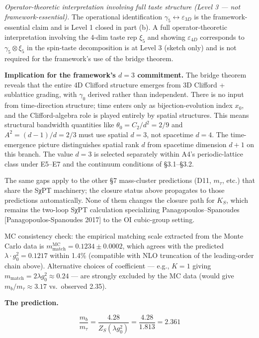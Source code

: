 \documentclass[
]{article}
\begin{document}
\emph{Operator-theoretic interpretation involving full taste structure
(Level 3 --- not framework-essential).} The operational identification
\(\gamma_5 \leftrightarrow \varepsilon_{3D}\) is the framework-essential
claim and is Level 1 closed in part (b). A full operator-theoretic
interpretation involving the 4-dim taste rep \(\xi_5\) and showing
\(\varepsilon_{4D}\) corresponds to \(\gamma_5 \otimes \xi_5\) in the
spin-taste decomposition is at Level 3 (sketch only) and is not required
for the framework's use of the bridge theorem.

\textbf{Implication for the framework's \(d = 3\) commitment.} The
bridge theorem reveals that the entire 4D Clifford structure emerges
from 3D Clifford + sublattice grading, with \(\gamma_0\) derived rather
than independent. There is no input from time-direction structure; time
enters only as bijection-evolution index \(x_0\), and the
Clifford-algebra role is played entirely by spatial structures. This
means structural bandwidth quantities like \(\theta_0 = C_2/d^2 = 2/9\)
and \(A^2 = (d-1)/d = 2/3\) must use spatial \(d = 3\), not spacetime
\(d = 4\). The time-emergence picture distinguishes spatial rank \(d\)
from spacetime dimension \(d+1\) on this branch. The value \(d = 3\) is
selected separately within A4's periodic-lattice class under E5--E7 and
the continuum conditions of §3.1--§3.2.

The same gaps apply to the other §7 mass-cluster predictions (D11,
\(m_\tau\), etc.) that share the SχPT machinery; the closure status
above propagates to those predictions automatically. None of them
changes the closure path for \(K_S\), which remains the two-loop SχPT
calculation specializing Panagopoulos--Spanoudes
{[}Panagopoulos-Spanoudes 2017{]} to the OI cubic-group setting.

MC consistency check: the empirical matching scale extracted from the
Monte Carlo data is
\(m_{\text{match}}^{\text{MC}} = 0.1234 \pm 0.0002\), which agrees with
the predicted \(\lambda \cdot g_0^2 = 0.1217\) within 1.4\% (compatible
with NLO truncation of the leading-order chain above). Alternative
choices of coefficient --- e.g., \(K = 1\) giving
\(m_{\text{match}} = 2\lambda g_0^2 \approx 0.24\) --- are strongly
excluded by the MC data (would give \(m_b/m_\tau \approx 3.17\)
vs.~observed 2.35).

\textbf{The prediction.}

\[\boxed{\frac{m_b}{m_\tau} = \frac{4.28}{Z_S(\lambda g_0^2)} = \frac{4.28}{1.813} = 2.361}\]
\end{document}

